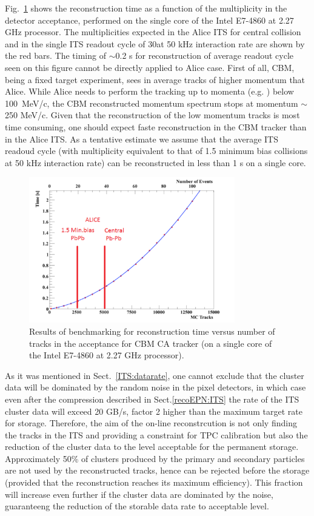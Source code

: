 Fig.~\ref{fig:ITSrecotimeCBM} shows the reconstruction time as a function of the multiplicity 
in the detector acceptance, performed on the single core of the Intel E7-4860 at 2.27 GHz processor. 
The multiplicities expected in the Alice ITS
for central \pbpb collision and in the single ITS readout cycle of 30\ums at 50 kHz interaction rate are shown
by the red bars. The timing of $\sim$0.2 s for reconstruction of average readout cycle seen on this figure cannot
be directly applied to Alice case. First of all, CBM, being a fixed target experiment, sees in average tracks of 
higher momentum that Alice. While Alice needs to perform the tracking up to momenta (e.g. \pt) below 100~MeV/c,
the CBM reconstructed momentum spectrum stops at momentum $\sim$250 MeV/c. Given that the reconstruction of the 
low momentum tracks is most time consuming, one should expect faste reconstruction in the CBM
tracker than in the Alice ITS. As a tentative estimate we assume that the average ITS readoud cycle (with multiplicity
equivalent to that of 1.5 minimum bias \pbpb collisions at 50 kHz interaction rate) can be reconstructed in less than
1 s on a single core. 

\begin{figure}[h]
\centering
\includegraphics[width=0.80\textwidth]{ITS/IK_CBMrecotime.pdf}
\caption{\label{fig:ITSrecotimeCBM} 
Results of benchmarking for reconstruction time versus number of 
tracks in the acceptance for CBM CA tracker (on a single core of the Intel
E7-4860 at 2.27 GHz processor).
}
\end{figure}


As it was mentioned 
in Sect.~\ref{ITS:datarate}, one cannot exclude that the cluster data will be dominated by the random noise in
the pixel detectors, in which case even after the compression described in Sect.\ref{recoEPN:ITS} the rate
of the ITS cluster data will exceed 20 GB/s, factor 2 higher than the maximum target rate for storage.
Therefore, the aim of the on-line reconstrcution is not only finding the tracks in the ITS and providing a 
constraint for TPC calibration
but also the reduction of the cluster data to the level acceptable for the permanent storage. 
Approximately 50\% of clusters produced by the primary and secondary particles are not used by the 
reconstructed tracks, hence can be rejected before the storage (provided that the reconstruction reaches its
maximum efficiency). This fraction will increase even further if the cluster data are dominated by the noise,
guaranteeng the reduction of the storable data rate to acceptable level. 

